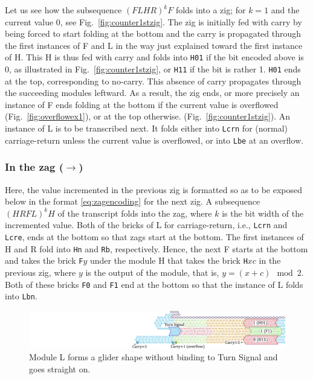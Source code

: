\documentclass[runningheads]{llncs}
\begin{document}
Let us see how the subsequence $(FLHR)^kF$ folds into a zig; for $k=1$ and the current value 0, see Fig.~\ref{fig:counter1stzig}.
The zig is initially fed with carry by being forced to start folding at the bottom and the carry is propagated through the first instances of F and L in the way just explained toward the first instance of H.
This H is thus fed with carry and folds into \texttt{H01} if the bit encoded above is 0, as illustrated in Fig.~\ref{fig:counter1stzig}, or \texttt{H11} if the bit is rather 1.
\texttt{H01} ends at the top, corresponding to no-carry.
This absence of carry propagates through the succeeding modules leftward.
As a result, the zig ends, or more precisely an instance of F ends folding at the bottom if the current value is overflowed (Fig.~\ref{fig:overflowex1}), or at the top otherwise. (Fig.~\ref{fig:counter1stzig}).
An instance of L is to be transcribed next.
It folds either into \texttt{Lcrn} for (normal) carriage-return unless the current value is overflowed, or into \texttt{Lbe} at an overflow.

\subsubsection{In the zag ($\rightarrow$)}
Here, the value incremented in the previous zig is formatted so as to be exposed below in the format \eqref{eq:zagencoding} for the next zig.
A subsequence $(HRFL)^kH$ of the transcript folds into the zag, where $k$ is the bit width of the incremented value.
Both of the bricks of L for carriage-return, i.e., \texttt{Lcrn} and \texttt{Lcre}, ends at the bottom so that zags start at the bottom.
The first instances of H and R fold into \texttt{Hn} and \texttt{Rb}, respectively.
Hence, the next F starts at the bottom and takes the brick \texttt{F}$y$ under the module H  that takes the brick \texttt{H}$xc$ in the previous zig, where $y$ is the output of the module, that is, $y = (x+c) \mod 2$.
Both of these bricks \texttt{F0} and \texttt{F1} end at the bottom so that the instance of L folds into \texttt{Lbn}.


\begin{figure}[tb]
\centering
\includegraphics[width=\linewidth]{fig/svg/CounterEx14_1.pdf}
\caption{
Module L forms a glider shape without binding to Turn Signal and goes straight on. 
}
\label{fig:overflowex2}
\end{figure}
\end{document}
